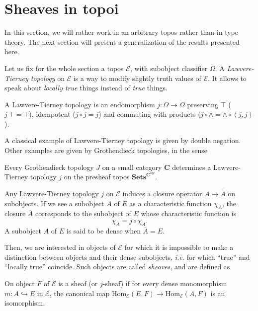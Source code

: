 \documentclass[notfinal]{jfrarticle}
\newcommand \True {\top}
\newcommand \closure[1] {\overline{#1}}
\newcommand \Char[1] {\chi_{#1}}%
\newcommand \Hom[1] {\mathrm{Hom}_{#1}}
\newcommand{\ie}{\emph{i.e.}}
\begin{document}
\section{Sheaves in topoi}
\label{sec:sheaf_topos}

In this section, we will rather work in an arbitrary topos rather than in type theory. The next section will present a
generalization of the results presented here.

Let us fix for the whole section a topos $\mathcal E$, with subobject
classifier $\Omega$. A {\em Lawvere-Tierney topology} on $\mathcal E$
is a way to modify slightly truth values of $\mathcal E$. It allows to
speak about {\em locally true} things instead of {\em true} things.

\begin{defi}\label{defi:LT}
  A Lawvere-Tierney topology is an endomorphism $j:\Omega \to \Omega$
  preserving $\True$ ($j \ \True = \True$), idempotent ($j\circ j =
  j$) and commuting with products ($j \circ \wedge = \wedge \circ (j,j)$).
\end{defi}

A classical example of Lawvere-Tierney topology is given by double
negation. Other examples are given by Grothendieck topologies, in the
sense
\begin{thm}
  Every Grothendieck topology $J$ on a small category $\mathbf C$ determines a
  Lawvere-Tierney topology $j$ on the presheaf topos
  $\mathbf{Sets}^{\mathbf C^{\mathbf{op}}}$.
\end{thm}

Any Lawvere-Tierney topology $j$ on $\mathcal E$ induces a closure operator
$A \mapsto \closure{A}$ on subobjects. If we see a subobject $A$ of $E$
as a characteristic function $\Char{A}$, the closure $\closure{A}$
corresponds to the subobject of $E$ whose characteristic function is 
%
\[
\Char{\closure{A}} = j \circ \Char{A}.
\]%
%
A subobject $A$ of $E$ is said to
be dense when $\closure{A} = E$.

Then, we are interested in objects of $\mathcal E$ for which it is
impossible to make a distinction between objects and their dense
subobjects, \ie{} for which ``true'' and ``locally true''
coincide. Such objects are called {\em sheaves}, and are defined as

\begin{defi}
  On object $F$ of $\mathcal E$ is a sheaf (or $j$-sheaf) if for every
  dense monomorphism $m: A \hookrightarrow E$ in $\mathcal E$, the
  canonical map $\Hom{\mathcal E}(E,F) \rightarrow \Hom{\mathcal E}(A,F)$ is an
isomorphism.
\end{defi}
\end{document}
